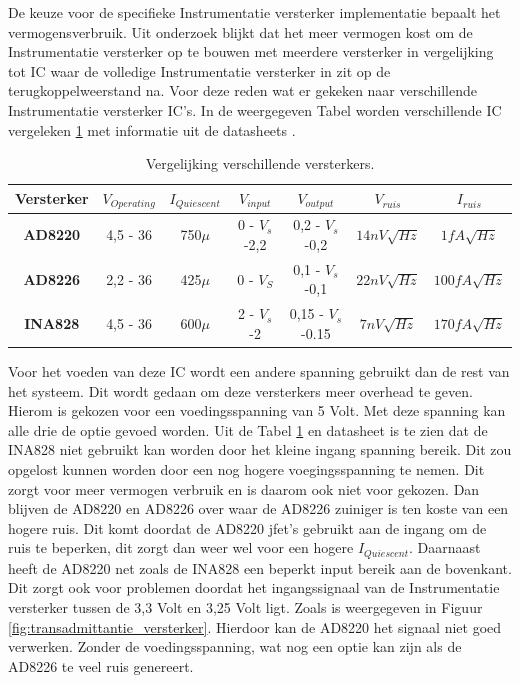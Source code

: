 De keuze voor de specifieke Instrumentatie versterker implementatie bepaalt het vermogensverbruik. Uit onderzoek blijkt dat het meer vermogen kost om de Instrumentatie versterker op te bouwen met meerdere versterker in vergelijking tot IC waar de volledige Instrumentatie versterker in zit op de terugkoppelweerstand na. Voor deze reden wat er gekeken naar verschillende Instrumentatie versterker IC's. In de weergegeven Tabel worden verschillende IC vergeleken \ref{tab:amplifer_comparison} met informatie uit de datasheets \cite{AD8220, AD8226, INA828}.

\begin{table}[H]
    \centering
    \begin{tabular}{|c|c|c|c|c|c|c|}
        \hline
        \textbf{Versterker} & $V_{Operating}$ & $I_{Quiescent}$ & $V_{input}$ & $V_{output}$ & $V_{ruis}$ & $I_{ruis}$ \\ \hline
        
        \textbf{AD8220} &  4,5 - 36 &  750$\mu$ & 0 - $V_s$-2,2 & 0,2 - $V_s$-0,2 & $14 nV\sqrt{Hz}$ & $1 fA\sqrt{Hz}$ \\ \hline
        
        \textbf{AD8226} & 2,2 - 36 & 425$\mu$ & 0 - $V_S$ & 0,1 - $V_s$-0,1 & $22 nV\sqrt{Hz}$ & $100 fA\sqrt{Hz}$\\ \hline
        
        \textbf{INA828} & 4,5 - 36 & 600$\mu$ & 2 - $V_s$-2 & 0,15 - $V_s$-0.15 & $7 nV\sqrt{Hz}$ & $170 fA\sqrt{Hz}$\\ \hline
        
    \end{tabular}
    \caption{Vergelijking verschillende versterkers.}
    \label{tab:amplifer_comparison}
\end{table}
Voor het voeden van deze IC wordt een andere spanning gebruikt dan de rest van het systeem. Dit wordt gedaan om deze versterkers meer overhead te geven. Hierom is gekozen voor een voedingsspanning van 5 Volt. Met deze spanning kan alle drie de optie gevoed worden. Uit de Tabel \ref{tab:amplifer_comparison} en datasheet is te zien dat de INA828 niet gebruikt kan worden door het kleine ingang spanning bereik. Dit zou opgelost kunnen worden door een nog hogere voegingsspanning te nemen. Dit zorgt voor meer vermogen verbruik en is daarom ook niet voor gekozen. Dan blijven de AD8220 en AD8226 over waar de AD8226 zuiniger is ten koste van een hogere ruis. Dit komt doordat de AD8220 jfet's gebruikt aan de ingang om de ruis te beperken, dit zorgt dan weer wel voor een hogere $I_{Quiescent}$. Daarnaast heeft de AD8220 net zoals de INA828 een beperkt input bereik aan de bovenkant. Dit zorgt ook voor problemen doordat het ingangssignaal van de Instrumentatie versterker tussen de 3,3 Volt en 3,25 Volt ligt. Zoals is weergegeven in Figuur \ref{fig:transadmittantie_versterker}. Hierdoor kan de AD8220 het signaal niet goed verwerken. Zonder de voedingsspanning, wat nog een optie kan zijn als de AD8226 te veel ruis genereert. 

